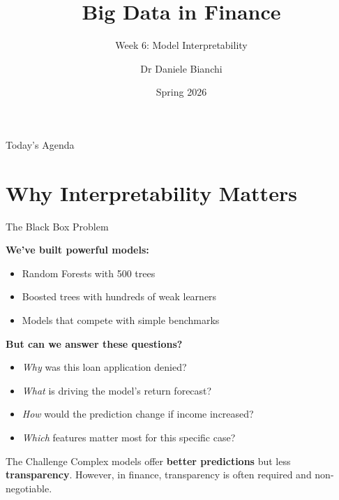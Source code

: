 \documentclass[10pt]{beamer}
\title{Big Data in Finance}
\subtitle{Week 6: Model Interpretability}
\author{Dr Daniele Bianchi}
\date{Spring 2026}
\newcommand{\highlight}[1]{\textcolor{AccentOrange}{\textbf{#1}}}
\begin{document}
\AtBeginSection[]{
  \begin{frame}[plain]
    \vfill
    \begin{center}
      {\Large\color{ThemeBlue}\insertsection}
    \end{center}
    \vfill
  \end{frame}
}


\begin{frame}[plain]
  \titlepage
\end{frame}

\begin{frame}{Today's Agenda}
  \tableofcontents
\end{frame}

\section{Why Interpretability Matters}

\begin{frame}{The Black Box Problem}

  \textbf{We've built powerful models:}
  \begin{itemize}
    \item Random Forests with 500 trees
    \item Boosted trees with hundreds of weak learners
    \item Models that compete with simple benchmarks
  \end{itemize}

  \vspace{1em}
  \textbf{But can we answer these questions?}
  \begin{itemize}
    \item \textit{Why} was this loan application denied?
    \item \textit{What} is driving the model's return forecast?
    \item \textit{How} would the prediction change if income increased?
    \item \textit{Which} features matter most for this specific case?
  \end{itemize}

  \vspace{0.5em}
  \begin{block}{The Challenge}
    Complex models offer \highlight{better predictions} but less \highlight{transparency}. However, in finance, transparency is often required and non-negotiable.
  \end{block}
\end{frame}
\end{document}
